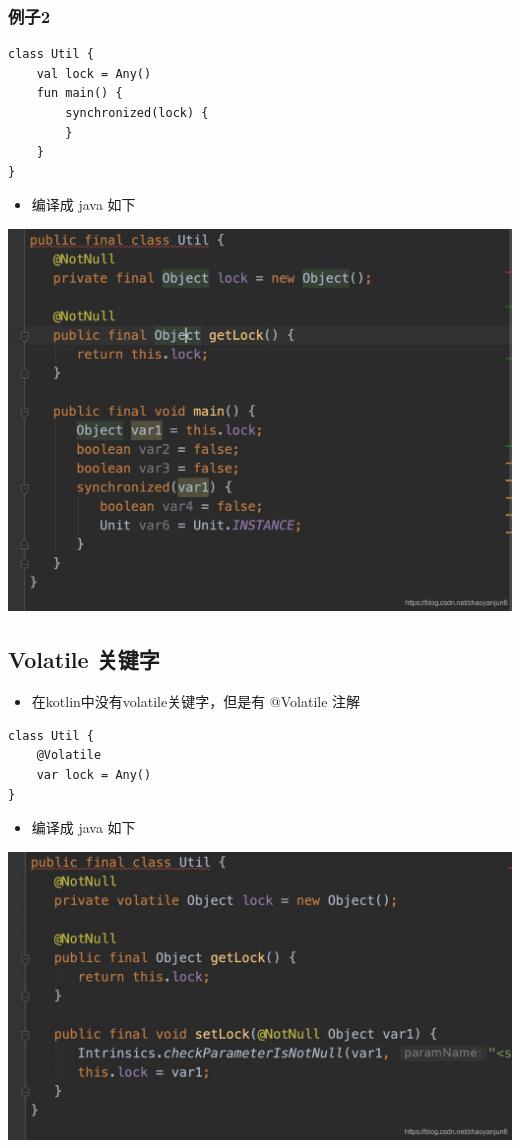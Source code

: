 \documentclass[9pt, b5paper]{article}
\begin{document}
\subsubsection{例子2}
\label{sec-5-2-2}
\begin{verbatim}
class Util {
    val lock = Any()
    fun main() {
        synchronized(lock) {
        }
    }
}
\end{verbatim}
\begin{itemize}
\item 编译成 java 如下
\end{itemize}

\includegraphics[width=.9\linewidth]{./pic/eg2.png}

\subsection{Volatile 关键字}
\label{sec-5-3}
\begin{itemize}
\item 在kotlin中没有volatile关键字，但是有 @Volatile 注解
\end{itemize}
\begin{verbatim}
class Util {
    @Volatile
    var lock = Any()
}
\end{verbatim}
\begin{itemize}
\item 编译成 java 如下
\end{itemize}

\includegraphics[width=.9\linewidth]{./pic/eg3.png}
\end{document}
